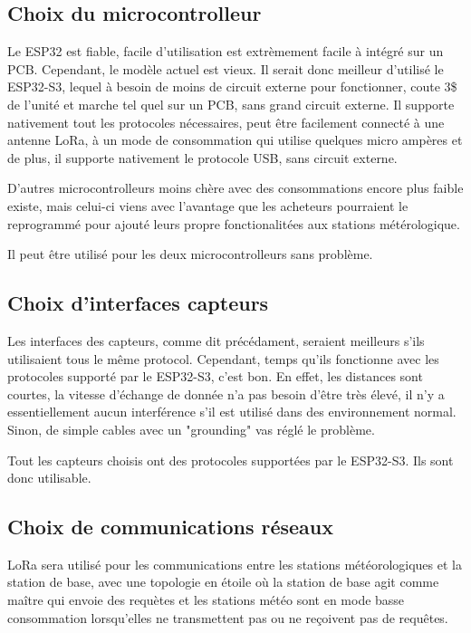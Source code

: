 
\subsection{Choix du microcontrolleur}
Le ESP32 est fiable, facile d'utilisation est extrèmement facile à intégré sur un PCB. Cependant, le modèle actuel est vieux.
Il serait donc meilleur d'utilisé le ESP32-S3, lequel à besoin de moins de circuit externe pour fonctionner, coute 3\$ de l'unité
et marche tel quel sur un PCB, sans grand circuit externe.
Il supporte nativement tout les protocoles nécessaires, peut être facilement connecté à une antenne LoRa, à un mode de consommation
qui utilise quelques micro ampères et de plus, il supporte nativement le protocole USB, sans circuit externe.

D'autres microcontrolleurs moins chère avec des consommations encore plus faible existe, mais celui-ci viens avec l'avantage que les
acheteurs pourraient le reprogrammé pour ajouté leurs propre fonctionalitées aux stations métérologique.

Il peut être utilisé pour les deux microcontrolleurs sans problème.

\subsection{Choix d'interfaces capteurs}
Les interfaces des capteurs, comme dit précédament, seraient meilleurs s'ils utilisaient tous le même protocol.
Cependant, temps qu'ils fonctionne avec les protocoles supporté par le ESP32-S3, c'est bon. En effet, les distances
sont courtes, la vitesse d'échange de donnée n'a pas besoin d'être très élevé, il n'y a essentiellement aucun interférence s'il
est utilisé dans des environnement normal. Sinon, de simple cables avec un "grounding" vas réglé le problème.

Tout les capteurs choisis ont des protocoles supportées par le ESP32-S3. Ils sont donc utilisable.

\subsection{Choix de communications réseaux}
LoRa sera utilisé pour les communications entre les stations météorologiques et la station de base, avec une topologie en étoile où 
la station de base agit comme maître qui envoie des requètes et les stations météo sont en mode basse consommation lorsqu'elles ne transmettent pas ou ne 
reçoivent pas de requêtes. 


